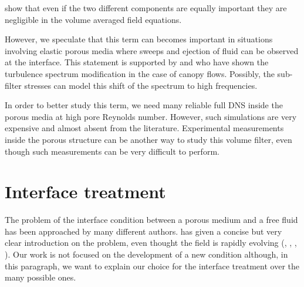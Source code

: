 \citet{breugem2006influence} show that even if the two different components are equally important they are negligible in the volume averaged field equations.

%

However, we speculate that this term can becomes important in situations involving elastic porous media where sweeps and ejection of fluid can be observed at the interface.
This statement is supported by \citet{finnigan2000turbulence} and \citet{de2008effects} who have shown the turbulence spectrum modification in the case of canopy flows. Possibly, the sub-filter stresses can model this shift of the spectrum to high frequencies.

In order to better study this term, we need many reliable full DNS inside the porous media at high pore Reynolds number. However, such simulations are very expensive and almost absent from the literature.
Experimental measurements inside the porous structure can be another way to study this volume filter, even though such measurements can be very difficult to perform.

\section{Interface treatment}
\label{ch:interface}

The problem of the interface condition between a porous medium and a free fluid has been approached by many different authors. \citet{ehrhardt2010interface} has given a concise but very clear introduction on the problem, even thought the field is rapidly evolving (\citet{minale2014momentum}, \citet{angot2017asymptotic}, \citet{lacis2017framework}, \citet{zampogna2017new}).
Our work is not focused on the development of a new condition although, in this paragraph, we want to explain our choice for the interface treatment over the many possible ones.


